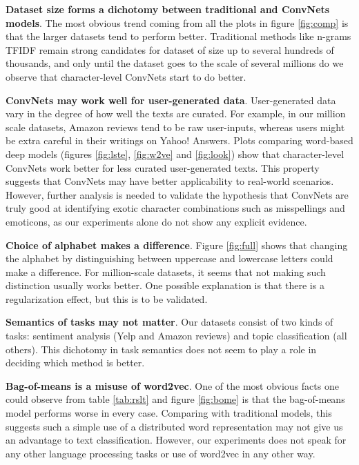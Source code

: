 \textbf{Dataset size forms a dichotomy between traditional and ConvNets models}. The most obvious trend coming from all the plots in figure \ref{fig:comp} is that the larger datasets tend to perform better. Traditional methods like n-grams TFIDF remain strong candidates for dataset of size up to several hundreds of thousands, and only until the dataset goes to the scale of several millions do we observe that character-level ConvNets start to do better.

\textbf{ConvNets may work well for user-generated data}. User-generated data vary in the degree of how well the texts are curated. For example, in our million scale datasets, Amazon reviews tend to be raw user-inputs, whereas users might be extra careful in their writings on Yahoo! Answers. Plots comparing word-based deep models (figures \ref{fig:lste}, \ref{fig:w2ve} and \ref{fig:look}) show that character-level ConvNets work better for less curated user-generated texts. This property suggests that ConvNets may have better applicability to real-world scenarios. However, further analysis is needed to validate the hypothesis that ConvNets are truly good at identifying exotic character combinations such as misspellings and emoticons, as our experiments alone do not show any explicit evidence.

\textbf{Choice of alphabet makes a difference}. Figure \ref{fig:full} shows that changing the alphabet by distinguishing between uppercase and lowercase letters could make a difference. For million-scale datasets, it seems that not making such distinction usually works better. One possible explanation is that there is a regularization effect, but this is to be validated.

\textbf{Semantics of tasks may not matter}. Our datasets consist of two kinds of tasks: sentiment analysis (Yelp and Amazon reviews) and topic classification (all others). This dichotomy in task semantics does not seem to play a role in deciding which method is better.

\textbf{Bag-of-means is a misuse of word2vec}\cite{LKW15}. One of the most obvious facts one could observe from table \ref{tab:rslt} and figure \ref{fig:bome} is that the bag-of-means model performs worse in every case. Comparing with traditional models, this suggests such a simple use of a distributed word representation may not give us an advantage to text classification. However, our experiments does not speak for any other language processing tasks or use of word2vec in any other way.


